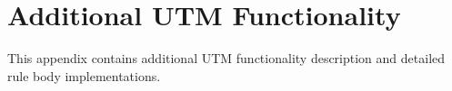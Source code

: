 \cleardoublepage

\chapter{Additional UTM Functionality}
\noindent This appendix contains additional UTM functionality description and detailed rule body implementations.

